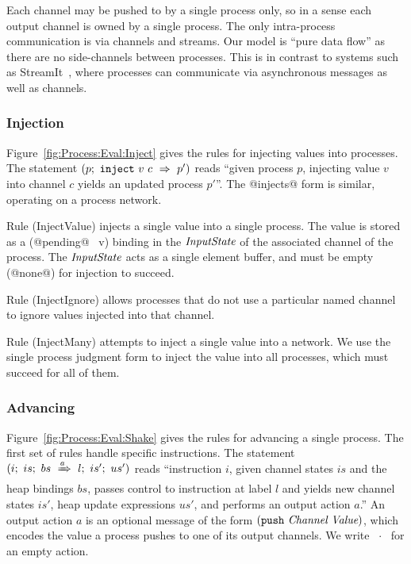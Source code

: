 Each channel may be pushed to by a single process only, so in a sense each output channel is owned by a single process. The only intra-process communication is via channels and streams. Our model is ``pure data flow'' as there are no side-channels between processes. This is in contrast to systems such as StreamIt~\cite{thies2002streamit}, where processes can communicate via asynchronous messages as well as channels.


\subsubsection{Injection}
Figure~\ref{fig:Process:Eval:Inject} gives the rules for injecting values into processes. The statement $(p;~\texttt{inject}~v~c~\Rightarrow~p')$ reads ``given process $p$, injecting value $v$ into channel $c$ yields an updated process $p'$''. The @injects@ form is similar, operating on a process network.

Rule (InjectValue) injects a single value into a single process. The value is stored as a (@pending@~ v) binding in the $\textit{InputState}$ of the associated channel of the process. The $\textit{InputState}$ acts as a single element buffer, and must be empty (@none@) for injection to succeed.

Rule (InjectIgnore) allows processes that do not use a particular named channel to ignore values injected into that channel.

Rule (InjectMany) attempts to inject a single value into a network. We use the single process judgment form to inject the value into all processes, which must succeed for all of them.






\subsubsection{Advancing}
Figure~\ref{fig:Process:Eval:Shake} gives the rules for advancing a single process. The first set of rules handle specific instructions. The statement $(i;~is;~bs~\xRightarrow{a}~l;~is';~us')$ reads ``instruction $i$, given channel states $is$ and the heap bindings $bs$, passes control to instruction at label $l$ and yields new channel states $is'$, heap update expressions $us'$, and performs an output action $a$.'' An output action $a$ is an optional message of the form $(\texttt{push}~\textit{Channel}~\textit{Value})$, which encodes the value a process pushes to one of its output channels. We write ~$\cdot$~ for an empty action. 

